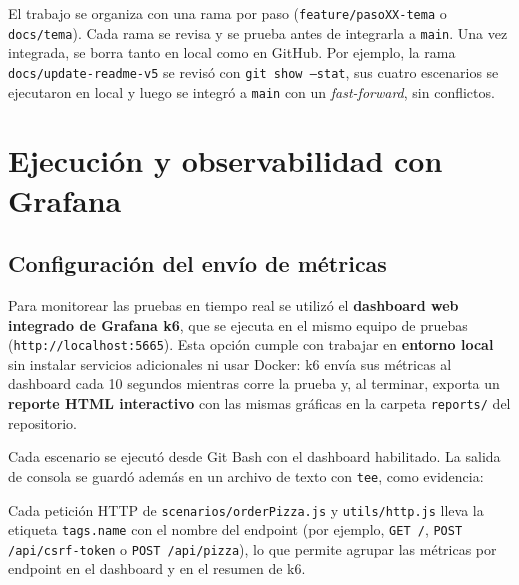 \documentclass[11pt]{article}
\makeatletter
\newcommand{\prompt}{{\color{bashVerde}PC- DAVID@LAPTOP-QNOIOQBU} {\color{bashMorado}MINGW64} {\color{bashAmarillo}\textasciitilde/quickpizza-performance-k6}}
\makeatother
\begin{document}
El trabajo se organiza con una rama por paso (\texttt{feature/pasoXX-tema} o
\texttt{docs/tema}). Cada rama se revisa y se prueba antes de integrarla a
\texttt{main}. Una vez integrada, se borra tanto en local como en GitHub. Por
ejemplo, la rama \texttt{docs/update-readme-v5} se revisó con
\texttt{git show --stat}, sus cuatro escenarios se ejecutaron en local y luego se
integró a \texttt{main} con un \emph{fast-forward}, sin conflictos.

\section{Ejecución y observabilidad con Grafana}

\subsection{Configuración del envío de métricas}

Para monitorear las pruebas en tiempo real se utilizó el \textbf{dashboard web
integrado de Grafana k6}, que se ejecuta en el mismo equipo de pruebas
(\texttt{http://localhost:5665}). Esta opción cumple con trabajar en
\textbf{entorno local} sin instalar servicios adicionales ni usar Docker: k6 envía
sus métricas al dashboard cada 10 segundos mientras corre la prueba y, al terminar,
exporta un \textbf{reporte HTML interactivo} con las mismas gráficas en la carpeta
\texttt{reports/} del repositorio.

Cada escenario se ejecutó desde Git Bash con el dashboard habilitado. La salida de
consola se guardó además en un archivo de texto con \texttt{tee}, como evidencia:


Cada petición HTTP de \texttt{scenarios/\allowbreak orderPizza.js} y \texttt{utils/http.js}
lleva la etiqueta \texttt{tags.name} con el nombre del endpoint (por ejemplo,
\texttt{GET /}, \texttt{POST /api/csrf-token} o \texttt{POST /api/pizza}), lo que
permite agrupar las métricas por endpoint en el dashboard y en el resumen de k6.
\end{document}
